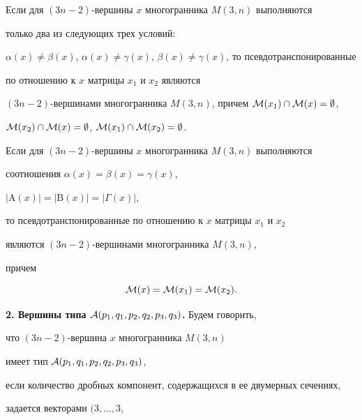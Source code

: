\begin{cor}


Если для $(3n-2)$-вершины $x$ многогранника $M(3,n)$ выполняются


только два из следующих трех условий:


$\alpha(x)\neq \beta(x)$, $\alpha(x)\neq \gamma


(x)$, $\beta(x)\neq \gamma(x)$, то псевдотранспонированные 


по отношению к $x$ матрицы $x_1$ и $x_2$ являются


$(3n-2)$-вершинами многогранника $M(3,n)$, причем ${\cal M}


(x_1)\cap{\cal M} (x)=\emptyset$,


${\cal M} (x_2)\cap{\cal M} (x)=\emptyset$, ${\cal M}


(x_1)\cap{\cal M} (x_2)=\emptyset$.


\end{cor}





\begin{notenonum}


Если для $(3n-2)$-вершины $x$ многогранника $M(3,n)$ выполняются


соотношения $\alpha(x)=\beta(x)=\gamma(x)$,


$|\mathrm A(x)|=|\mathrm B(x)|=| \Gamma(x)|$, 


то псевдотранспонированные по отношению к $x$ матрицы $x_1$ и $x_2$


являются $(3n-2)$-вершинами многогранника $M(3,n)$, 


причем


$$


{\cal M}(x)={\cal M}(x_1)={\cal M}(x_2).


$$


\end{notenonum}








{\bf 2. Вершины типа ${\cal A}(p_1,q_1,p_2,q_2,p_3,q_3)$.} Будем говорить,


что $(3n-2)$-вершина $x$ многогранника $M(3,n)$ 


имеет тип ${\cal A}(p_1,q_1,p_2,q_2,p_3,q_3)$, 


если количество дробных компонент, содержащихся в ее двумерных сечениях,


задается векторами $(3,\dotsc,3$,


